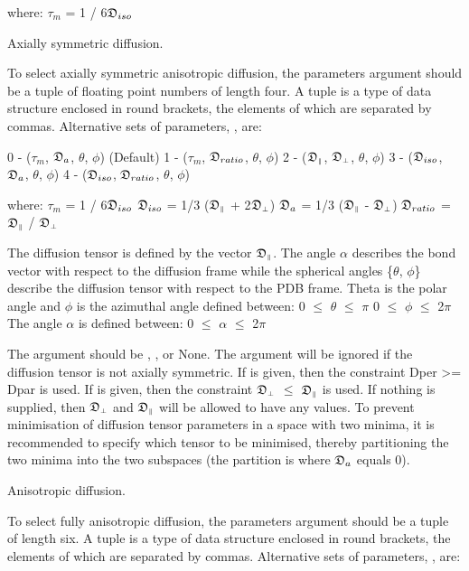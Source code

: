 where:
    $\tau_m$ = 1 / 6$\mathfrak{D}_{iso}$


Axially symmetric diffusion.

To select axially symmetric anisotropic diffusion, the parameters argument should be a tuple
of floating point numbers of length four.  A tuple is a type of data structure enclosed in
round brackets, the elements of which are separated by commas.  Alternative sets of
parameters, 
, are:

    0 - ($\tau_m$, $\mathfrak{D}_a$, $\theta$, $\phi$)   (Default)
    1 - ($\tau_m$, $\mathfrak{D}_{ratio}$, $\theta$, $\phi$)
    2 - ($\mathfrak{D}_{\scriptscriptstyle \parallel}$, $\mathfrak{D}_{\scriptscriptstyle \perp}$, $\theta$, $\phi$)
    3 - ($\mathfrak{D}_{iso}$, $\mathfrak{D}_a$, $\theta$, $\phi$)
    4 - ($\mathfrak{D}_{iso}$, $\mathfrak{D}_{ratio}$, $\theta$, $\phi$)

where:
    $\tau_m$ = 1 / 6$\mathfrak{D}_{iso}$
    $\mathfrak{D}_{iso}$ = 1/3 ($\mathfrak{D}_{\scriptscriptstyle \parallel}$ + 2$\mathfrak{D}_{\scriptscriptstyle \perp}$)
    $\mathfrak{D}_a$ = 1/3 ($\mathfrak{D}_{\scriptscriptstyle \parallel}$ - $\mathfrak{D}_{\scriptscriptstyle \perp}$)
    $\mathfrak{D}_{ratio}$ = $\mathfrak{D}_{\scriptscriptstyle \parallel}$ / $\mathfrak{D}_{\scriptscriptstyle \perp}$

The diffusion tensor is defined by the vector $\mathfrak{D}_{\scriptscriptstyle \parallel}$.  The angle $\alpha$ describes the bond
vector with respect to the diffusion frame while the spherical angles \{$\theta$, $\phi$\} describe
the diffusion tensor with respect to the PDB frame.  Theta is the polar angle and $\phi$ is the
azimuthal angle defined between:
    0 $\le$ $\theta$ $\le$ $\pi$
    0 $\le$ $\phi$ $\le$ 2$\pi$
The angle $\alpha$ is defined between:
    0 $\le$ $\alpha$ $\le$ 2$\pi$

The 
 argument should be 
, 
, or None.  The argument will be
ignored if the diffusion tensor is not axially symmetric.  If 
 is given, then the
constraint Dper >= Dpar is used.  If 
 is given, then the constraint $\mathfrak{D}_{\scriptscriptstyle \perp}$ $\le$ $\mathfrak{D}_{\scriptscriptstyle \parallel}$ is
used.  If nothing is supplied, then $\mathfrak{D}_{\scriptscriptstyle \perp}$ and $\mathfrak{D}_{\scriptscriptstyle \parallel}$ will be allowed to have any values.  To
prevent minimisation of diffusion tensor parameters in a space with two minima, it is
recommended to specify which tensor to be minimised, thereby partitioning the two minima
into the two subspaces (the partition is where $\mathfrak{D}_a$ equals 0).


Anisotropic diffusion.

To select fully anisotropic diffusion, the parameters argument should be a tuple of length
six.  A tuple is a type of data structure enclosed in round brackets, the elements of which
are separated by commas.  Alternative sets of parameters, 
, are:

